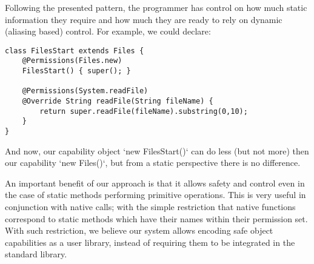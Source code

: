 \documentclass[a4paper,twoside,british,9pt]{extarticle}
\providecommand*{\code}[1]{\Q`#1`}
\begin{document}
 Following the
presented pattern, the programmer has control on how much static information
they require and how much they are ready to rely on dynamic (aliasing
based) control. For example, we could declare:

\begin{lstlisting}
class FilesStart extends Files {
	@Permissions(Files.new)
	FilesStart() { super(); }

	@Permissions(System.readFile)
	@Override String readFile(String fileName) {
		return super.readFile(fileName).substring(0,10);
	}
}
\end{lstlisting}

And now, our capability object \code{new FilesStart()} can do less
(but not more) then our capability \code{new Files()}, but from a
static perspective there is no difference.

An important benefit of our approach is that it allows safety and
control even in the case of static methods performing primitive operations.
This is very useful in conjunction with native calls; with the simple restriction
that native functions correspond to static methods which have their names within their permission set.
With such restriction, we believe our system allows encoding safe object capabilities as
a user library, instead of requiring them to be integrated in the
standard library. 
\end{document}
